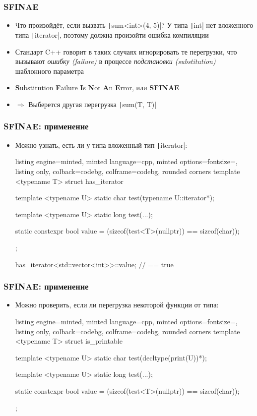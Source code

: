 \documentclass[10pt]{beamer}
\begin{document}
\begin{frame}[fragile]
\frametitle{SFINAE}
\begin{itemize}
\item Что произойдёт, если вызвать \texttt|sum<int>(4, 5)|? \pause У типа \texttt|int| нет вложенного типа \texttt|iterator|, поэтому должна произойти ошибка компиляции
\pause
\item Стандарт C++ говорит в таких случаях игнорировать те перегрузки, что вызывают \textit{ошибку (failure)} в процессе \textit{подстановки (substitution)} шаблонного параметра
\pause
\item \textbf{S}ubstitution \textbf{F}ailure \textbf{I}s \textbf{N}ot \textbf{A}n \textbf{E}rror, или \textbf{SFINAE}
\pause
\item \(\Longrightarrow\) Выберется другая перегрузка \texttt|sum(T, T)|
\end{itemize}
\end{frame}

\begin{frame}[fragile]
\frametitle{SFINAE: применение}
\begin{itemize}
\item Можно узнать, есть ли у типа вложенный тип \texttt|iterator|:
\begin{tcblisting}{listing engine=minted, minted language=cpp, minted options={fontsize=\scriptsize}, listing only, colback=codebg, colframe=codebg, rounded corners}
template <typename T>
struct has_iterator {
  template <typename U>
  static char test(typename U::iterator*);

  template <typename U>
  static long test(...);

  static constexpr bool value =
    (sizeof(test<T>(nullptr)) == sizeof(char));
};

has_iterator<std::vector<int>>::value; // == true
\end{tcblisting}
\end{itemize}
\end{frame}

\begin{frame}[fragile]
\frametitle{SFINAE: применение}
\begin{itemize}
\item Можно проверить, если ли перегрузка некоторой функции от типа:
\begin{tcblisting}{listing engine=minted, minted language=cpp, minted options={fontsize=\scriptsize}, listing only, colback=codebg, colframe=codebg, rounded corners}
template <typename T>
struct is_printable {
  template <typename U>
  static char test(decltype(print(U))*);

  template <typename U>
  static long test(...);

  static constexpr bool value =
    (sizeof(test<T>(nullptr)) == sizeof(char));
};
\end{tcblisting}
\end{itemize}
\end{frame}
\end{document}
